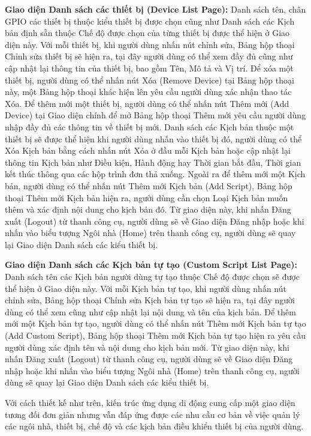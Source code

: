 \documentclass[11pt,a4paper,oneside]{book}
\begin{document}
\textbf{Giao diện Danh sách các thiết bị (Device List Page):} Danh sách tên, chân GPIO các thiết bị thuộc kiểu thiết bị được chọn cũng như Danh sách các Kịch bản định sẵn thuộc Chế độ được chọn của từng thiết bị được thể hiện ở Giao diện này. Với mỗi thiết bị, khi người dùng nhấn nút chỉnh sửa, Bảng hộp thoại Chỉnh sửa thiết bị sẽ hiện ra, tại đây người dùng có thể xem đầy đủ cũng như cập nhật lại thông tin của thiết bị, bao gồm Tên, Mô tả và Vị trí. Để xóa một thiết bị, người dùng có thể nhấn nút Xóa (Remove Device) tại Bảng hộp thoại này, một Bảng hộp thoại khác hiện lên yêu cầu người dùng xác nhận thao tác Xóa. Để thêm mới một thiết bị, người dùng có thể nhấn nút Thêm mới (Add Device) tại Giao diện chính để mở Bảng hộp thoại Thêm mới yêu cầu người dùng nhập đầy đủ các thông tin về thiết bị mới. Danh sách các Kịch bản thuộc một thiết bị sẽ được thể hiện khi người dùng nhấn vào thiết bị đó, người dùng có thể Xóa Kịch bản bằng cách nhấn nút Xóa ở đầu mỗi Kịch bản hoặc cập nhật lại thông tin Kịch bản như Điều kiện, Hành động hay Thời gian bắt đầu, Thời gian kết thúc thông qua các hộp trình đơn thả xuống. Ngoài ra để thêm mới một Kịch bản, người dùng có thể nhấn nút Thêm mới Kịch bản (Add Script), Bảng hộp thoại Thêm mới Kịch bản hiện ra, người dùng cần chọn Loại Kịch bản muốn thêm và xác định nội dung cho kịch bản đó. Từ giao diện này, khi nhấn Đăng xuất (Logout) từ thanh công cụ, người dùng sẽ về Giao diện Đăng nhập hoặc khi nhấn vào biểu tượng Ngôi nhà (Home) trên thanh công cụ, người dùng sẽ quay lại Giao diện Danh sách các kiểu thiết bị.

\textbf{Giao diện Danh sách các Kịch bản tự tạo (Custom Script List Page):} Danh sách tên các Kịch bản người dùng tự tạo thuộc Chế độ được chọn sẽ được thể hiện ở Giao diện này. Với mỗi Kịch bản tự tạo, khi người dùng nhấn nút chỉnh sửa, Bảng hộp thoại Chỉnh sửa Kịch bản tự tạo sẽ hiện ra, tại đây người dùng có thể xem cũng như cập nhật lại nội dung và tên của kịch bản. Để thêm mới một Kịch bản tự tạo, người dùng có thể nhấn nút Thêm mới Kịch bản tự tạo (Add Custom Script), Bảng hộp thoại Thêm mới Kịch bản tự tạo hiện ra yêu cầu người dùng xác định tên và nội dung cho kịch bản mới. Từ giao diện này, khi nhấn Đăng xuất (Logout) từ thanh công cụ, người dùng sẽ về Giao diện Đăng nhập hoặc khi nhấn vào biểu tượng Ngôi nhà (Home) trên thanh công cụ, người dùng sẽ quay lại Giao diện Danh sách các kiểu thiết bị.

Với cách thiết kế như trên, kiến trúc ứng dụng di động cung cấp một giao diện tương đối đơn giản nhưng vẫn đáp ứng được các nhu cầu cơ bản về việc quản lý các ngôi nhà, thiết bị, chế độ và các kịch bản điều khiển thiết bị của người dùng.
\end{document}

